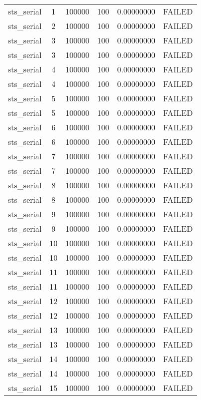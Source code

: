 \begin{longtable}{cccccc}
sts\_serial & 1 & 100000 & 100 & 0.00000000 & FAILED \\
sts\_serial & 2 & 100000 & 100 & 0.00000000 & FAILED \\
sts\_serial & 3 & 100000 & 100 & 0.00000000 & FAILED \\
sts\_serial & 3 & 100000 & 100 & 0.00000000 & FAILED \\
sts\_serial & 4 & 100000 & 100 & 0.00000000 & FAILED \\
sts\_serial & 4 & 100000 & 100 & 0.00000000 & FAILED \\
sts\_serial & 5 & 100000 & 100 & 0.00000000 & FAILED \\
sts\_serial & 5 & 100000 & 100 & 0.00000000 & FAILED \\
sts\_serial & 6 & 100000 & 100 & 0.00000000 & FAILED \\
sts\_serial & 6 & 100000 & 100 & 0.00000000 & FAILED \\
sts\_serial & 7 & 100000 & 100 & 0.00000000 & FAILED \\
sts\_serial & 7 & 100000 & 100 & 0.00000000 & FAILED \\
sts\_serial & 8 & 100000 & 100 & 0.00000000 & FAILED \\
sts\_serial & 8 & 100000 & 100 & 0.00000000 & FAILED \\
sts\_serial & 9 & 100000 & 100 & 0.00000000 & FAILED \\
sts\_serial & 9 & 100000 & 100 & 0.00000000 & FAILED \\
sts\_serial & 10 & 100000 & 100 & 0.00000000 & FAILED \\
sts\_serial & 10 & 100000 & 100 & 0.00000000 & FAILED \\
sts\_serial & 11 & 100000 & 100 & 0.00000000 & FAILED \\
sts\_serial & 11 & 100000 & 100 & 0.00000000 & FAILED \\
sts\_serial & 12 & 100000 & 100 & 0.00000000 & FAILED \\
sts\_serial & 12 & 100000 & 100 & 0.00000000 & FAILED \\
sts\_serial & 13 & 100000 & 100 & 0.00000000 & FAILED \\
sts\_serial & 13 & 100000 & 100 & 0.00000000 & FAILED \\
sts\_serial & 14 & 100000 & 100 & 0.00000000 & FAILED \\
sts\_serial & 14 & 100000 & 100 & 0.00000000 & FAILED \\
sts\_serial & 15 & 100000 & 100 & 0.00000000 & FAILED \\

\end{longtable}
